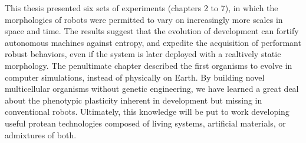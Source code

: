 This thesis presented six sets of experiments (chapters 2 to 7), in which the morphologies of robots were permitted to vary on increasingly more scales in space and time.
The results suggest that the evolution of development can 
fortify autonomous machines against entropy,
and
expedite the acquisition of performant robust behaviors,
even if the system is later deployed with a realtively static morphology.
The penultimate chapter described the first organisms to evolve in computer simulations, instead of physically on Earth.
By building novel multicellular organisms without genetic engineering, we have learned a great deal about the phenotypic plasticity inherent in development but missing in conventional robots.
Ultimately, this knowledge will be put to work developing useful protean technologies composed of living systems, artificial materials, or admixtures of both.



\nocite{kriegman2017minimal,kriegman2018morphological, kriegman2018interoceptive,kriegman2019automated,kriegman2019why, kriegman2020sim2real4designs,kriegman2020xenobots}

